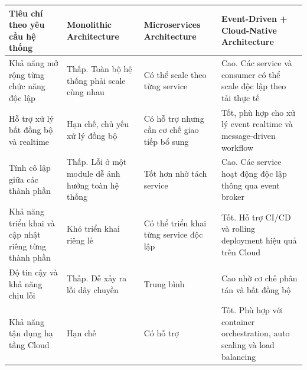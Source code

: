 \begin{table}[H]
    \centering
    \renewcommand{\arraystretch}{1.4}
    \small
    \begin{tabularx}{\textwidth}{|p{4.5cm}|X|X|X|}
        \hline
        \textbf{Tiêu chí theo yêu cầu hệ thống}               &
        \textbf{Monolithic Architecture}                      &
        \textbf{Microservices Architecture}                   &
        \textbf{Event-Driven + Cloud-Native Architecture}                             \\
        \hline

        Khả năng mở rộng từng chức năng độc lập               &
        Thấp. Toàn bộ hệ thống phải scale cùng nhau           &
        Có thể scale theo từng service                        &
        Cao. Các service và consumer có thể scale độc lập theo tải thực tế            \\
        \hline

        Hỗ trợ xử lý bất đồng bộ và realtime                  &
        Hạn chế, chủ yếu xử lý đồng bộ                        &
        Có hỗ trợ nhưng cần cơ chế giao tiếp bổ sung          &
        Tốt, phù hợp cho xử lý event realtime và message-driven workflow              \\
        \hline

        Tính cô lập giữa các thành phần                       &
        Thấp. Lỗi ở một module dễ ảnh hưởng toàn hệ thống     &
        Tốt hơn nhờ tách service                              &
        Cao. Các service hoạt động độc lập thông qua event broker                     \\
        \hline

        Khả năng triển khai và cập nhật riêng từng thành phần &
        Khó triển khai riêng lẻ                               &
        Có thể triển khai từng service độc lập                &
        Tốt. Hỗ trợ CI/CD và rolling deployment hiệu quả trên Cloud                   \\
        \hline

        Độ tin cậy và khả năng chịu lỗi                       &
        Thấp. Dễ xảy ra lỗi dây chuyền                        &
        Trung bình                                            &
        Cao nhờ cơ chế phân tán và bất đồng bộ                                        \\
        \hline

        Khả năng tận dụng hạ tầng Cloud                       &
        Hạn chế                                               &
        Có hỗ trợ                                             &
        Tốt. Phù hợp với container orchestration, auto scaling và load balancing      \\
        \hline


\end{tabularx}
\end{table}
